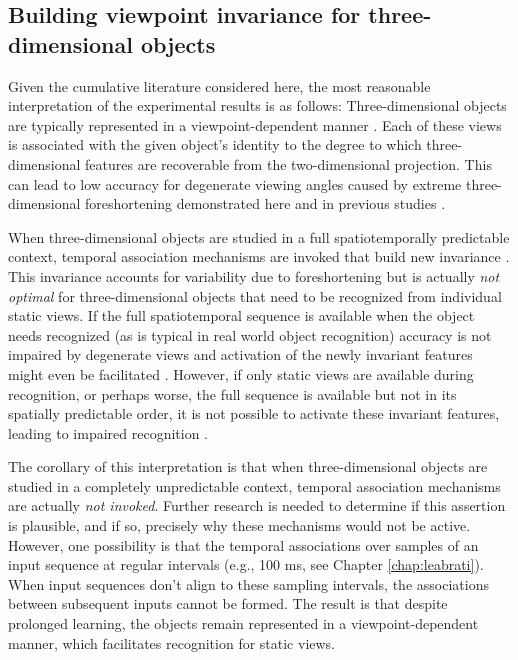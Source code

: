 \documentclass[dwyatte_dissertation.tex]{subfiles}
\begin{document}
\subsection{Building viewpoint invariance for three-dimensional objects}
Given the cumulative literature considered here, the most reasonable interpretation of the experimental results is as follows: Three-dimensional objects are typically represented in a viewpoint-dependent manner \cite{WallisBulthoff99,EdelmanBulthoff92,TarrGauthier98,LogothetisPaulsBulthoffEtAl94,LogothetisPaulsPoggio95}. Each of these views is associated with the given object's identity to the degree to which three-dimensional features are recoverable from the two-dimensional projection. This can lead to low accuracy for degenerate viewing angles caused by extreme three-dimensional foreshortening demonstrated here and in previous studies \cite{BalasSinha09b}. 

When three-dimensional objects are studied in a full spatiotemporally predictable context, temporal association mechanisms are invoked that build new invariance \cite{CoxMeierOerteltEtAl05,LiDiCarlo08,LiDiCarlo10,LiDiCarlo12}. This invariance accounts for variability due to foreshortening but is actually \textit{not optimal} for three-dimensional objects that need to be recognized from individual static views. If the full spatiotemporal sequence is available when the object needs recognized (as is typical in real world object recognition) accuracy is not impaired by degenerate views and activation of the newly invariant features might even be facilitated \cite{BalasSinha09c}. However, if only static views are available during recognition, or perhaps worse, the full sequence is available but not in its spatially predictable order, it is not possible to activate these invariant features, leading to impaired recognition \cite{Stone98,VuongTarr04,ChuangVuongBulthoff12}.

The corollary of this interpretation is that when three-dimensional objects are studied in a completely unpredictable context, temporal association mechanisms are actually \textit{not invoked}. Further research is needed to determine if this assertion is plausible, and if so, precisely why these mechanisms would not be active. However, one possibility is that the temporal associations over samples of an input sequence at regular intervals (e.g., 100 ms, see Chapter \ref{chap:leabrati}). When input sequences don't align to these sampling intervals, the associations between subsequent inputs cannot be formed. The result is that despite prolonged learning, the objects remain represented in a viewpoint-dependent manner, which facilitates recognition for static views.

%
%
\end{document}
